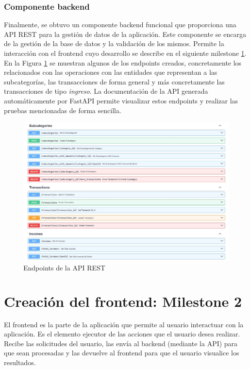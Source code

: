 \subsubsection{Componente backend}
Finalmente, se obtuvo un componente backend funcional que proporciona una API REST para la gestión de datos de la aplicación. Este componente se encarga de la gestión de la base de datos y la validación de los mismos. Permite la interacción con el frontend cuyo desarrollo se describe en el siguiente milestone \ref{chap:milestone2}. En la Figura \ref{fig:endpoints} se muestran algunos de los endpoints creados, concretamente los relacionados con las operaciones con las entidades que representan a las subcategorías, las transacciones de forma general y más concretamente las transacciones de tipo \textit{ingreso}. La documentación de la API generada automáticamente por FastAPI permite visualizar estos endpoints y realizar las pruebas mencionadas de forma sencilla.

\begin{figure}[ht!]
    \centering
    \includegraphics[width=\linewidth]{imagenes/endpoints.jpg}
    \caption{Endpoints de la API REST}
    \label{fig:endpoints}
\end{figure}


\section{Creación del frontend: Milestone 2}\label{chap:milestone2}
El frontend es la parte de la aplicación que permite al usuario interactuar con la aplicación. Es el elemento ejecutor de las acciones que el usuario desea realizar. Recibe las solicitudes del usuario, las envía al backend (mediante la API) para que sean procesadas y las devuelve al frontend para que el usuario visualice los resultados.

